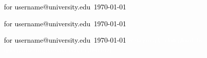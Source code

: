 \documentclass[12pt]{article}
\makeatletter
\providecommand{\email}{username@university.edu}
\newcommand{\mytext}{\textcolor{black}{for \email\ \today}}
\makeatother
\begin{document}
\pagestyle{empty}

\sffamily\fontsize{34}{0}\selectfont
\vspace*{0.9\textheight}
\begin{rotate}{90}
\mytext
\end{rotate}

\sffamily\fontsize{40}{0}\selectfont
\hspace*{0.07\textwidth}
\begin{rotate}{52.3} %
\mytext
\end{rotate}

\vfill
\sffamily\fontsize{24}{0}\selectfont
\mytext
\normalsize
\textcolor{white}{watermark: download by \email \today}
\end{document}
